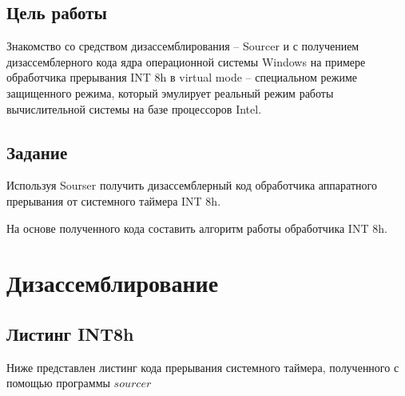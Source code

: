 \section*{Цель работы}
Знакомство со средством дизассемблирования – Sourcer и с получением дизассемблерного кода ядра операционной системы Windows на примере обработчика прерывания INT 8h в virtual mode – специальном режиме защищенного режима, который эмулирует реальный режим работы вычислительной системы на базе процессоров Intel.
\section*{Задание}
Используя Sourser получить дизассемблерный код обработчика аппаратного прерывания от системного таймера INT 8h.

На основе полученного кода составить алгоритм работы обработчика INT 8h. 
\chapter{Дизассемблирование}
\section{Листинг INT8h}
Ниже представлен листинг кода прерывания системного таймера, полученного с помощью программы $sourcer$

